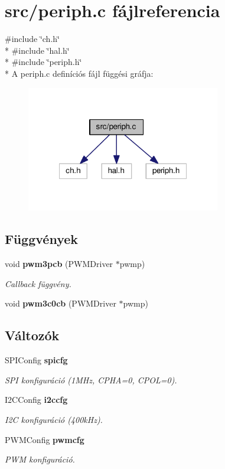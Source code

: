 \section{src/periph.c fájlreferencia}
\label{periph_8c}
{\ttfamily \#include \char`\"{}ch.\-h\char`\"{}}\\*
{\ttfamily \#include \char`\"{}hal.\-h\char`\"{}}\\*
{\ttfamily \#include \char`\"{}periph.\-h\char`\"{}}\\*
A periph.\-c definíciós fájl függési gráfja\-:
\nopagebreak
\begin{figure}[H]
\begin{center}
\leavevmode
\includegraphics[width=240pt]{periph_8c__incl}
\end{center}
\end{figure}
\subsection*{Függvények}
\begin{DoxyCompactItemize}
\item 
void {\bf pwm3pcb} (P\-W\-M\-Driver $\ast$pwmp)
\begin{DoxyCompactList}\small\item\em Callback függvény. \end{DoxyCompactList}\item 
void {\bf pwm3c0cb} (P\-W\-M\-Driver $\ast$pwmp)
\end{DoxyCompactItemize}
\subsection*{Változók}
\begin{DoxyCompactItemize}
\item 
S\-P\-I\-Config {\bf spicfg}
\begin{DoxyCompactList}\small\item\em S\-P\-I konfiguráció (1\-M\-Hz, C\-P\-H\-A=0, C\-P\-O\-L=0). \end{DoxyCompactList}\item 
I2\-C\-Config {\bf i2ccfg}
\begin{DoxyCompactList}\small\item\em I2\-C konfiguráció (400k\-Hz). \end{DoxyCompactList}\item 
P\-W\-M\-Config {\bf pwmcfg}
\begin{DoxyCompactList}\small\item\em P\-W\-M konfiguráció. \end{DoxyCompactList}\end{DoxyCompactItemize}


